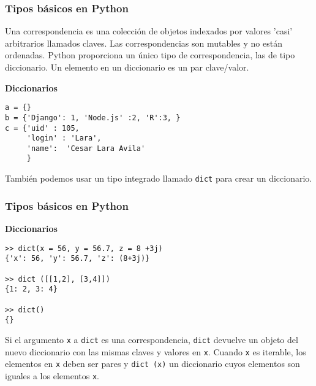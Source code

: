 \documentclass[10pt]{beamer}
\begin{document}
\begin{frame}[fragile]
\frametitle{Tipos b\'asicos en Python}
Una correspondencia es una colecci\'on de objetos indexados por valores 'casi' arbitrarios llamados claves. Las correspondencias son mutables y no est\'an ordenadas. Python proporciona un \'unico tipo de correspondencia, las de tipo diccionario. Un elemento en un diccionario es un par clave/valor.

\vspace{0.2cm}


\textbf{Diccionarios}
\begin{lstlisting}
a = {}
b = {'Django': 1, 'Node.js' :2, 'R':3, }
c = {'uid' : 105,
	 'login' : 'Lara',
	 'name':  'Cesar Lara Avila'
	 }
\end{lstlisting}

\vspace{0.2cm}

Tambi\'en podemos usar un tipo integrado llamado \texttt{dict} para crear un  diccionario.

\end{frame}

\begin{frame}[fragile]
\frametitle{Tipos b\'asicos en Python}

\textbf{Diccionarios}

\vspace{0.2cm}

\begin{lstlisting}
>> dict(x = 56, y = 56.7, z = 8 +3j)  
{'x': 56, 'y': 56.7, 'z': (8+3j)}

>> dict ([[1,2], [3,4]])
{1: 2, 3: 4}

>> dict()
{}
\end{lstlisting}

\vspace{0.2cm}

Si el argumento \texttt{x} a \texttt{dict} es una correspondencia, \texttt{dict} devuelve un objeto del nuevo diccionario con las mismas claves y valores en \texttt{x}. Cuando \texttt{x} es iterable, los elementos en \texttt{x} deben ser pares y \texttt{dict (x)} un diccionario cuyos elementos son iguales a los elementos \texttt{x}. 

\end{frame}
\end{document}
